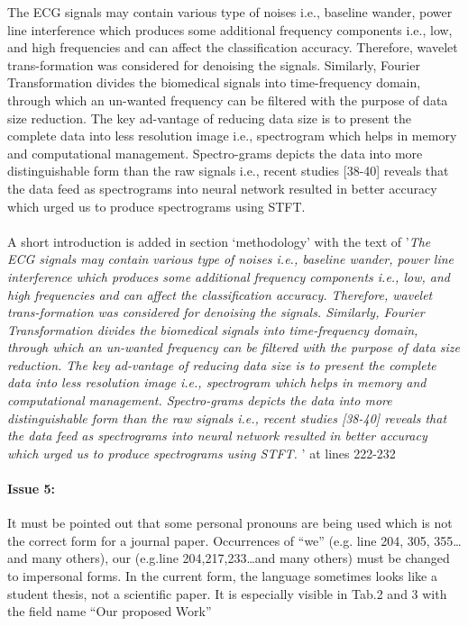 \documentclass{article}
\begin{document}
The ECG signals may contain various type of noises i.e., baseline wander, power line interference which produces some additional frequency components i.e., low, and high frequencies and can affect the classification accuracy. Therefore, wavelet trans-formation was considered for denoising the signals. Similarly, Fourier Transformation divides the biomedical signals into time-frequency domain, through which an un-wanted frequency can be filtered with the purpose of data size reduction. The key ad-vantage of reducing data size is to present the complete data into less resolution image i.e., spectrogram which helps in memory and computational management. Spectro-grams depicts the data into more distinguishable form than the raw signals i.e., recent studies [38-40] reveals that the data feed as spectrograms into neural network resulted in better accuracy which urged us to produce spectrograms using STFT.  \\\\

A short introduction is added in section `methodology' with the text of '\textit{The ECG signals may contain various type of noises i.e., baseline wander, power line interference which produces some additional frequency components i.e., low, and high frequencies and can affect the classification accuracy. Therefore, wavelet trans-formation was considered for denoising the signals. Similarly, Fourier Transformation divides the biomedical signals into time-frequency domain, through which an un-wanted frequency can be filtered with the purpose of data size reduction. The key ad-vantage of reducing data size is to present the complete data into less resolution image i.e., spectrogram which helps in memory and computational management. Spectro-grams depicts the data into more distinguishable form than the raw signals i.e., recent studies [38-40] reveals that the data feed as spectrograms into neural network resulted in better accuracy which urged us to produce spectrograms using STFT. }' at lines 222-232
 
\paragraph{Issue 5:}
\begin{displayquote}
It must be pointed out that some personal pronouns are being used which is not the correct form for a journal paper. Occurrences of “we” (e.g. line 204, 305, 355…and many others), our (e.g.line 204,217,233…and many others) must be changed to impersonal forms.  In the current form, the language sometimes looks like a student thesis, not a scientific paper. It is especially visible in Tab.2 and 3 with the field name “Our proposed Work”
\end{displayquote}
\end{document}
